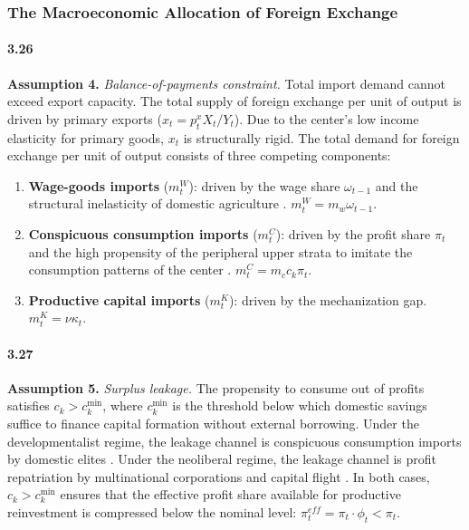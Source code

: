 \subsubsection{The Macroeconomic Allocation of Foreign
	Exchange}

\paragraph{3.26}
\textbf{Assumption 4.} \textit{Balance-of-payments
	constraint.} Total import demand cannot exceed export
capacity. The total supply of foreign exchange per unit of
output is driven by primary exports
($x_t = p_t^x X_t / Y_t$). Due to the center's low income
elasticity for primary goods, $x_t$ is structurally rigid.
The total demand for foreign exchange per unit of output
consists of three competing components:
\begin{enumerate}
	\item \textbf{Wage-goods imports} ($m^W_t$): driven by the
	wage share $\omega_{t-1}$ and the structural inelasticity
	of domestic agriculture \citep{Kaldor1959}.
	$m^W_t = m_w \omega_{t-1}$.
	\item \textbf{Conspicuous consumption imports} ($m^C_t$):
	driven by the profit share $\pi_t$ and the high propensity
	of the peripheral upper strata to imitate the consumption
	patterns of the center \citep{Prebisch1981, Kaldor1959}.
	$m^C_t = m_c c_k \pi_t$.
	\item \textbf{Productive capital imports} ($m^K_t$): driven
	by the mechanization gap. $m^K_t = \nu \kappa_t$.
\end{enumerate}

\paragraph{3.27}
\textbf{Assumption 5.} \textit{Surplus leakage.} The
propensity to consume out of profits satisfies
$c_k > c_k^{\min}$, where $c_k^{\min}$ is the threshold
below which domestic savings suffice to finance capital
formation without external borrowing. Under the
developmentalist regime, the leakage channel is conspicuous
consumption imports by domestic elites
\citep{Prebisch1981, Kaldor1959}. Under the neoliberal
regime, the leakage channel is profit repatriation by
multinational corporations and capital flight
\citep{Ahumada2019}. In both cases, $c_k > c_k^{\min}$
ensures that the effective profit share available for
productive reinvestment is compressed below the nominal
level: $\pi_t^{eff} = \pi_t \cdot \phi_t < \pi_t$.

